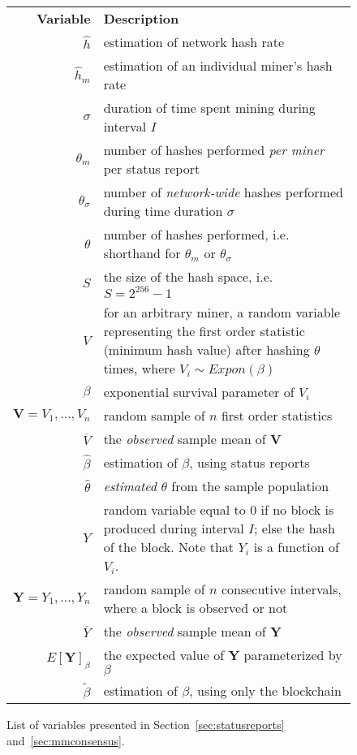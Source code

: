 \documentclass[10pt,sigconf]{acmart}
\newcommand{\1}{{\em (i)}}
\newcommand{\2}{{\em (ii)}}
\newcommand{\3}{{\em (iii)}}
\newcommand{\4}{{\em (iv)}}
\newcommand{\5}{{\em (v)}}
\begin{document}
\begin{figure}[t]
\hspace{-2.5ex}\colorbox{gray!10}{
\begin{tabular}{rp{}}

\textbf{Variable} & \textbf{Description} \\
$\hat{h}$ & estimation of network hash rate \\
$\hat{h}_m$ & estimation of an individual miner's  hash rate \\
$\sigma$ & 
duration of time spent mining during interval $I$ \\
$\theta_m$ & 
number of hashes performed \textit{per miner} per status report\\
$\theta_\sigma$ & 
number of \textit{network-wide} hashes performed during time duration $\sigma$\\
$\theta$ & 
number of hashes performed, i.e. shorthand for $\theta_m$ or $\theta_\sigma$ \\
$S$      &
the size of the hash space, i.e. $S=2^{256}-1$\\
$V$      & for an arbitrary miner, a random variable representing the first order statistic (minimum hash value) after hashing $\theta$ times, where $V_i\sim Expon(\beta)$\\
$\beta$      & exponential survival parameter of $V_i$ \\
$\textbf{V}=V_1,\dots,V_n$ &
random sample of $n$ first order statistics\\
$\overline{V}$ & the \textit{observed} sample mean of \textbf{V} \\
$\hat{\beta}$ & estimation of $\beta$, using status reports\\
\vspace{3ex}
$\hat{\theta}$ &
\textit{estimated} $\theta$ from the sample population \\
$Y$ & random variable equal to 0 if no block is produced during interval $I$; else the hash of the block. Note that $Y_i$ is a function of $V_i$.\\
$\textbf{Y} = Y_1,\ldots, Y_n$ & random sample of $n$ consecutive intervals, where a block is observed or not\\ 
$\overline{Y}$ & the \textit{observed} sample mean of \textbf{Y} \\
$E[\textbf{Y}]_\beta$ &
the expected value of \textbf{Y} parameterized by $\beta$\\
$\tilde{\beta}$ & estimation of $\beta$, using only the blockchain\\
\end{tabular}
}
\caption{List of variables presented in Section~\ref{sec:statusreports} and~\ref{sec:mmconsensus}.}

\end{figure}
\end{document}
